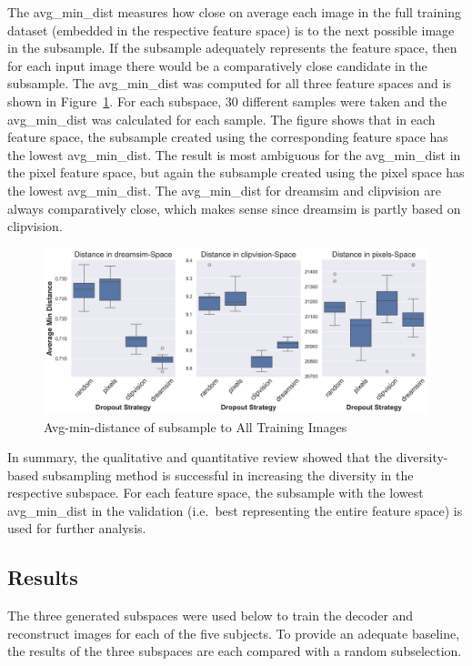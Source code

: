 The avg\_min\_dist measures how close on average each image in the full training dataset  (embedded in the respective feature space) is to the next possible image in the subsample. If the subsample adequately represents the feature space, then for each input image there would be a comparatively close candidate in the subsample. The avg\_min\_dist was computed for all three feature spaces and is shown in Figure~\ref{fig:dropout_avg_min_distance}. For each subspace, 30 different samples were taken and the avg\_min\_dist was calculated for each sample. The figure shows that in each feature space, the subsample created using the corresponding feature space has the lowest avg\_min\_dist. The result is most ambiguous for the avg\_min\_dist in the pixel feature space, but again the subsample created using the pixel space has the lowest avg\_min\_dist. The avg\_min\_dist for dreamsim and clipvision are always comparatively close, which makes sense since dreamsim is partly based on clipvision\cite{fuDreamSimLearningNew2023}. 

\begin{figure}[ht]
    \centering
    \includegraphics[width=1\textwidth]{plots/dropout_avg_min_distance.png}
    \caption{Avg-min-distance of subsample to All Training Images}\label{fig:dropout_avg_min_distance}
\end{figure}


In summary, the qualitative and quantitative review showed that the diversity-based subsampling method is successful in increasing the diversity in the respective subspace. For each feature space, the subsample with the lowest avg\_min\_dist in the validation (i.e.\ best representing the entire feature space) is used for further analysis.


\subsection{Results}
The three generated subspaces were used below to train the decoder and reconstruct images for each of the five subjects. To provide an adequate baseline, the results of the three subspaces are each compared with a random subselection. 

